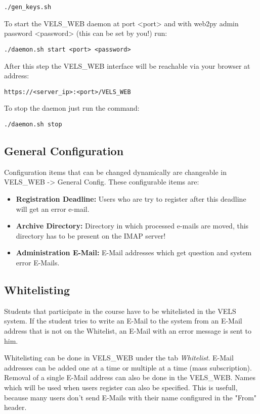 \begin{verbatim}
./gen_keys.sh    
\end{verbatim}

To start the VELS\_WEB daemon at port <port> and with web2py admin password 
<password> (this can be set by you!) run:
\begin{verbatim}
./daemon.sh start <port> <password> 
\end{verbatim}

After this step the VELS\_WEB interface will be reachable via your browser at
address:
\begin{verbatim}
https://<server_ip>:<port>/VELS_WEB
\end{verbatim}

To stop the daemon just run the command:

\begin{verbatim}
./daemon.sh stop
\end{verbatim}

\subsection{General Configuration}\label{sub:generalconfig}
Configuration items that can be changed dynamically are changeable in VELS\_WEB ->
General Config. These configurable items are:
\begin{itemize}
\item {\bf Registration Deadline:} Users who are try to register after this deadline will
    get an error e-mail.
\item {\bf Archive Directory:} Directory in which processed e-mails are moved, this
    directory has to be present on the IMAP server!
\item {\bf Administration E-Mail:} E-Mail addresses which get question and system error E-Mails.

\end{itemize}

\subsection{Whitelisting} \label{sub:whitelisting}
Students that participate in the course have to be whitelisted in the VELS system. If the student
tries to write an E-Mail to the system from an E-Mail address that is not on the Whitelist, an E-Mail
with an error message is sent to him.

Whitelisting can be done in VELS\_WEB under the tab {\it Whitelist}. E-Mail addresses can be added
one at a time or multiple at a time (mass subscription). Removal of a single E-Mail address
can also be done in the VELS\_WEB. Names which will be used when users register can also be 
specified. This is usefull, because many users don't send E-Mails with their name configured
in the "From" header.


